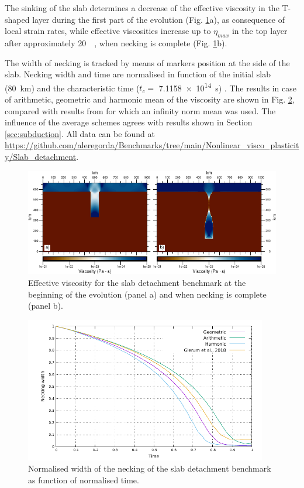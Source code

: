 \documentclass[hidelinks,10pt,a4paper]{article}
\begin{document}
The sinking of the slab determines a decrease of the effective viscosity in the T-shaped layer during the first part of the evolution (Fig. \ref{fig:slab}a),
as consequence of local strain rates, while effective viscosities increase up to $\eta_{max}$ in the top layer after approximately \SI{20}{\mega\year}, when
necking is complete (Fig. \ref{fig:slab}b).

The width of necking is tracked by means of markers position at the side of the slab. Necking width and time are normalised in function of the initial slab
(\SI{80}{\km}) and the characteristic time ($t_c=$ \SI{7.1158e14}{\s}) \citep{Schmalholz2011,Glerum2018}. The results in case of arithmetic, geometric and
harmonic mean of the viscosity are shown in Fig. \ref{fig:necking}, compared with results from \citet{Glerum2018} for which an infinity norm mean was used.
The influence of the average schemes agrees with results shown in Section \ref{sec:subduction}. All data can be 
found at \url{https://github.com/aleregorda/Benchmarks/tree/main/Nonlinear_visco_plasticity/Slab_detachment}.

\begin{figure}
\noindent\includegraphics[width=\textwidth]{./Figures/Slab.pdf}
\caption{Effective viscosity for the slab detachment benchmark at the beginning of the evolution (panel a) and when necking is complete (panel b).}
\label{fig:slab}
\end{figure}

\begin{figure}
\centering
\noindent\includegraphics[width=400px]{./Figures/Necking.pdf}
\caption{Normalised width of the necking of the slab detachment benchmark as function of normalised time.}
\label{fig:necking}
\end{figure}
\end{document}
